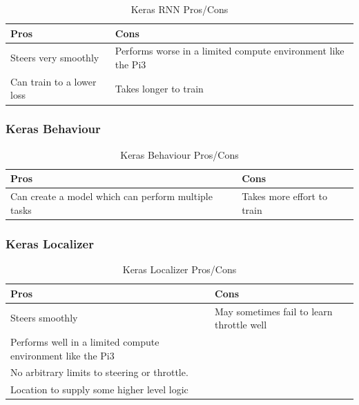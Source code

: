 \begin{table}[H]
\begin{center}
\begin{tabular}{|p{6cm}|p{6cm}|}
\hline
\textbf{Pros} & \textbf{Cons}\\
\hline
Steers very smoothly  & Performs worse in a limited compute environment like the Pi3\\
\hline
Can train to a lower loss   & Takes longer to train \\
\hline
\end{tabular}
\end{center}
\caption{Keras RNN Pros/Cons}
\end{table}


\subsubsection*{Keras Behaviour}

\begin{table}[H]
\begin{center}
\begin{tabular}{|p{6cm}|p{6cm}|}
\hline
\textbf{Pros} & \textbf{Cons}\\
\hline
Can create a model which can perform multiple tasks & Takes more effort to train \\
\hline
\end{tabular}
\end{center}
\caption{Keras Behaviour Pros/Cons}
\end{table}

\subsubsection*{Keras Localizer}

\begin{table}[H]
\begin{center}
\begin{tabular}{|p{6cm}|p{6cm}|}
\hline
\textbf{Pros} & \textbf{Cons}\\
\hline
Steers smoothly  & May sometimes fail to learn throttle well  \\
\hline
Performs well in a limited compute environment like the Pi3  & \\
\hline
No arbitrary limits to steering or throttle.  & \\
\hline
Location to supply some higher level logic & \\
\hline
\end{tabular}
\end{center}
\caption{Keras Localizer Pros/Cons}
\end{table}


